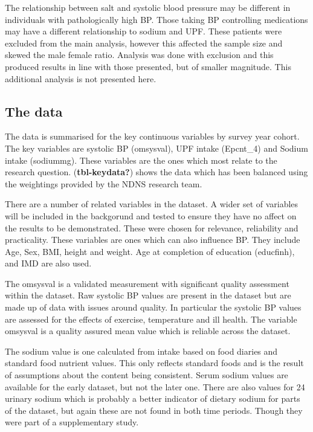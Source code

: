 \documentclass[
]{article}
\begin{document}
The relationship between salt and systolic blood pressure may be
different in individuals with pathologically high BP. Those taking BP
controlling medications may have a different relationship to sodium and
UPF. These patients were excluded from the main analysis, however this
affected the sample size and skewed the male female ratio. Analysis was
done with exclusion and this produced results in line with those
presented, but of smaller magnitude. This additional analysis is not
presented here.

\hypertarget{the-data}{%
\subsection{The data}\label{the-data}}

The data is summarised for the key continuous variables by survey year
cohort. The key variables are systolic BP (omsysval), UPF intake
(Epcnt\_4) and Sodium intake (sodiummg). These variables are the ones
which most relate to the research question. (\textbf{tbl-keydata?})
shows the data which has been balanced using the weightings provided by
the NDNS research team.

There are a number of related variables in the dataset. A wider set of
variables will be included in the backgorund and tested to ensure they
have no affect on the results to be demonstrated. These were chosen for
relevance, reliability and practicality. These variables are ones which
can also influence BP. They include Age, Sex, BMI, height and weight.
Age at completion of education (educfinh), and IMD are also used.

The omsysval is a validated measurement with significant quality
assessment within the dataset. Raw systolic BP values are present in the
dataset but are made up of data with issues around quality. In
particular the systolic BP values are assessed for the effects of
exercise, temperature and ill health. The variable omsysval is a quality
assured mean value which is reliable across the dataset.

The sodium value is one calculated from intake based on food diaries and
standard food nutrient values. This only reflects standard foods and is
the result of assumptions about the content being consistent. Serum
sodium values are available for the early dataset, but not the later
one. There are also values for 24 urinary sodium which is probably a
better indicator of dietary sodium for parts of the dataset, but again
these are not found in both time periods. Though they were part of a
supplementary study.
\end{document}
